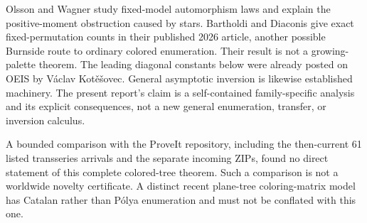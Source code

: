\documentclass[11pt]{article}
\theoremstyle{definition}
\begin{document}
Olsson and Wagner \cite{ow} study fixed-model automorphism laws and explain the positive-moment obstruction caused by stars. Bartholdi and Diaconis \cite{bd} give exact fixed-permutation counts in their published 2026 article, another possible Burnside route to ordinary colored enumeration. Their result is not a growing-palette theorem. The leading diagonal constants below were already posted on OEIS by V\'aclav Kot\v e\v sovec. General asymptotic inversion is likewise established machinery. The present report's claim is a self-contained family-specific analysis and its explicit consequences, not a new general enumeration, transfer, or inversion calculus.

A bounded comparison with the ProveIt repository, including the then-current 61 listed transseries arrivals and the separate incoming ZIPs, found no direct statement of this complete colored-tree theorem. Such a comparison is not a worldwide novelty certificate. A distinct recent plane-tree coloring-matrix model \cite{dfhtw} has Catalan rather than P\'olya enumeration and must not be conflated with this one.
\end{document}
